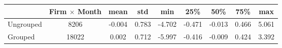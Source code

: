 \begin{tabular}{lcccccccc}
\toprule
{} &  Firm $ \times$ Month &   mean &    std &    min &    25\% &    50\% &    75\% &    max \\
\midrule
Ungrouped &                   8206 & -0.004 &  0.783 & -4.702 & -0.471 & -0.013 &  0.466 &  5.061 \\
Grouped   &                  18022 &  0.002 &  0.712 & -5.997 & -0.416 & -0.009 &  0.424 &  3.392 \\
\bottomrule
\end{tabular}
